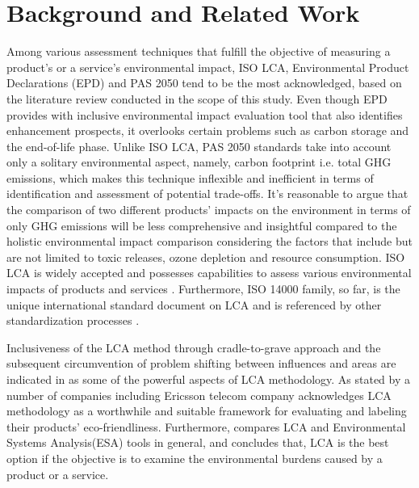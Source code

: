 \documentclass[conference]{IEEEtran}
\begin{document}
\section{Background and Related Work} 

Among various assessment techniques that fulfill the objective of measuring a product's or a service's environmental impact, ISO LCA\cite{ISO140402006}, Environmental Product Declarations (EPD)\cite{iso2006environmental} and PAS 2050 \cite{pas20082050} tend to be the most acknowledged, based on the literature review conducted in the scope of this study. Even though EPD provides with inclusive environmental impact evaluation tool that also identifies enhancement prospects, it overlooks certain problems such as carbon storage and the end-of-life phase. Unlike ISO LCA, PAS 2050 standards take into account only a solitary environmental aspect, namely, carbon footprint i.e. total GHG emissions, which makes this technique inflexible and inefficient in terms of identification and assessment of potential trade-offs.
It's reasonable to argue that the comparison of two different products' impacts on the environment in terms of only GHG emissions will be less comprehensive and insightful compared to the holistic environmental impact comparison considering the factors that include but are not limited to toxic releases, ozone depletion and resource consumption. ISO LCA is widely accepted and  possesses capabilities to assess various environmental impacts of products and services \cite{cooper2006life}. Furthermore,  ISO 14000 family, so far, is the unique international standard document on LCA and is referenced by other standardization processes \cite{finkbeiner201340s}.

Inclusiveness of the LCA method through cradle-to-grave approach and the subsequent circumvention of problem shifting between influences and areas are indicated in \cite{hermann2007assessing} as some of the powerful aspects of LCA methodology. As stated by \cite{guldbrandsson2012opportunities} a number of companies including Ericsson telecom company acknowledges LCA methodology as a worthwhile and suitable framework for evaluating and labeling their products' eco-friendliness. Furthermore, \cite{finnveden2000limitations} compares LCA and Environmental Systems Analysis(ESA) tools in general, and concludes that, LCA is the best option if the objective is to examine the environmental burdens caused by a product or a service.
\end{document}
